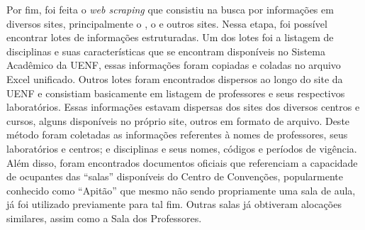 Por fim, foi feita o \textit{web scraping} que consistiu na busca por informações em diversos sites, principalmente o , o  e outros sites. Nessa etapa, foi possível encontrar lotes de informações estruturadas. Um dos lotes foi a listagem de disciplinas e suas características que se encontram disponíveis no Sistema Acadêmico da UENF, essas informações foram copiadas e coladas no arquivo Excel unificado. Outros lotes foram encontrados dispersos ao longo do site da UENF e consistiam basicamente em listagem de professores e seus respectivos laboratórios. Essas informações estavam dispersas dos sites dos diversos centros e cursos, alguns disponíveis no próprio site, outros em formato de arquivo. Deste método foram coletadas as informações referentes à nomes de professores, seus laboratórios e centros; e disciplinas e seus nomes, códigos e períodos de vigência. Além disso, foram encontrados documentos oficiais que referenciam a capacidade de ocupantes das ``salas'' disponíveis do Centro de Convenções, popularmente conhecido como ``Apitão'' que mesmo não sendo propriamente uma sala de aula, já foi utilizado previamente para tal fim. Outras salas já obtiveram alocações similares, assim como a Sala dos Professores.
